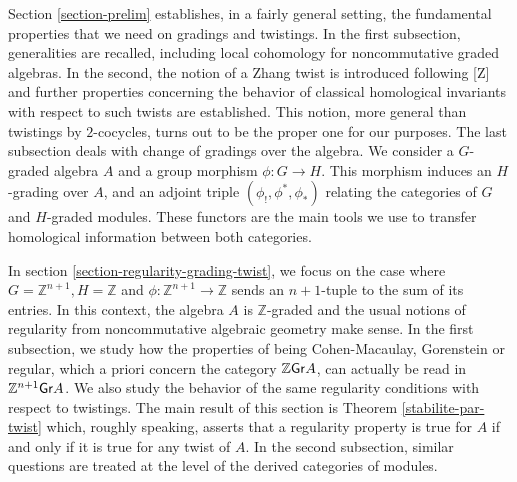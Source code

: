 \documentclass[twoside,11pt]{article}
\newcommand{\Z}{{\mathbb Z}}
\newcommand{\GrMod}{{\sf Gr}}
\begin{document}
Section \ref{section-prelim} establishes, in a fairly general setting, the fundamental
properties that we need on gradings and twistings. In the first subsection, generalities
are recalled, including local cohomology for noncommutative graded algebras. In the
second, the notion of a Zhang twist is introduced following [Z] and further properties
concerning the behavior of classical homological invariants with respect to such twists
are established. This notion, more general than twistings by $2$-cocycles, turns out to be
the proper one for our purposes. The last subsection deals with change of gradings over
the algebra. We consider a $G$-graded algebra $A$ and a group morphism $\phi : G
\longrightarrow H$. This morphism induces an $H$-grading over $A$, and an adjoint triple
$(\phi_!, \phi^*, \phi_*)$ relating the categories of $G$ and $H$-graded modules. These
functors are the main tools we use to transfer homological information between both
categories. 

In section \ref{section-regularity-grading-twist}, we focus on the case where $G=\Z^{n+1},
H=\Z$ and $\phi : \Z^{n+1} \longrightarrow \Z$ sends an $n+1$-tuple to the sum of its
entries. In this context, the algebra $A$ is $\Z$-graded and the usual notions of
regularity from noncommutative algebraic geometry make sense. In the first subsection, we
study how the properties of being Cohen-Macaulay, Gorenstein or regular, which a priori
concern the category $\Z\GrMod A$, can actually be read in $\Z^{n+1}\GrMod A$. We also study
the behavior of the same regularity conditions with respect to twistings. The main result
of this section is Theorem \ref{stabilite-par-twist} which, roughly speaking, asserts that
a regularity property is true for $A$ if and only if it is true for any twist of $A$. In
the second subsection, similar questions are treated at the level of the derived
categories of modules.
\end{document}

